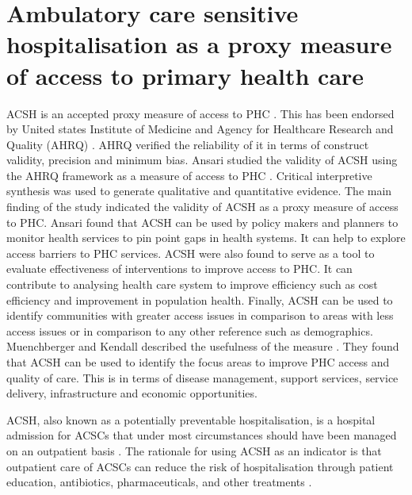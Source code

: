 \section{Ambulatory care sensitive hospitalisation as a proxy measure of access to primary health care}

ACSH is an accepted proxy measure of access to PHC \cite{10.1093/eurpub/cks053,ansari2012patient,magan2011hospitalizations,laditka2005more,WHO:assess:acsh,walker2013hospitalization,laberge2017hospitalizations,cecil2016primary}. This has been endorsed by United states Institute of Medicine\cite{millman1993access} and Agency for Healthcare Research and Quality (AHRQ) \cite{guide:AHRQ:2001}. AHRQ verified the reliability of it in terms of construct validity, precision and minimum bias. Ansari studied the validity of ACSH using the AHRQ framework as a measure of access to PHC \cite{ansari2007concept,guide:AHRQ:2001}. Critical interpretive synthesis was used to generate qualitative and quantitative evidence. The main finding of the study indicated the validity of ACSH as a proxy measure of access to PHC. Ansari found that ACSH can be used by policy makers and planners to monitor health services to pin point gaps in health systems. It can help to explore access barriers to PHC services. ACSH were also found to serve as a tool to evaluate effectiveness of interventions to improve access to PHC. It can contribute to analysing health care system to improve efficiency such as cost efficiency and improvement in population health. Finally, ACSH can be used to identify communities with greater access issues in comparison to areas with less access issues or in comparison to any other reference such as demographics. Muenchberger and Kendall described the usefulness of the measure \cite{muenchberger2010predictors}. They found that ACSH can be used to identify the focus areas to improve PHC access and quality of care. This is in terms of disease management, support services, service delivery, infrastructure and economic opportunities.  

ACSH, also known as a potentially preventable hospitalisation, is a hospital admission for ACSCs that under most circumstances should have been managed on an outpatient basis \cite{porter2007avoidable,weeks2016rates}.
The rationale for using ACSH as an indicator is that outpatient care of ACSCs can reduce the risk of hospitalisation through patient education, antibiotics, pharmaceuticals, and other treatments \cite{laditka2009health}.

